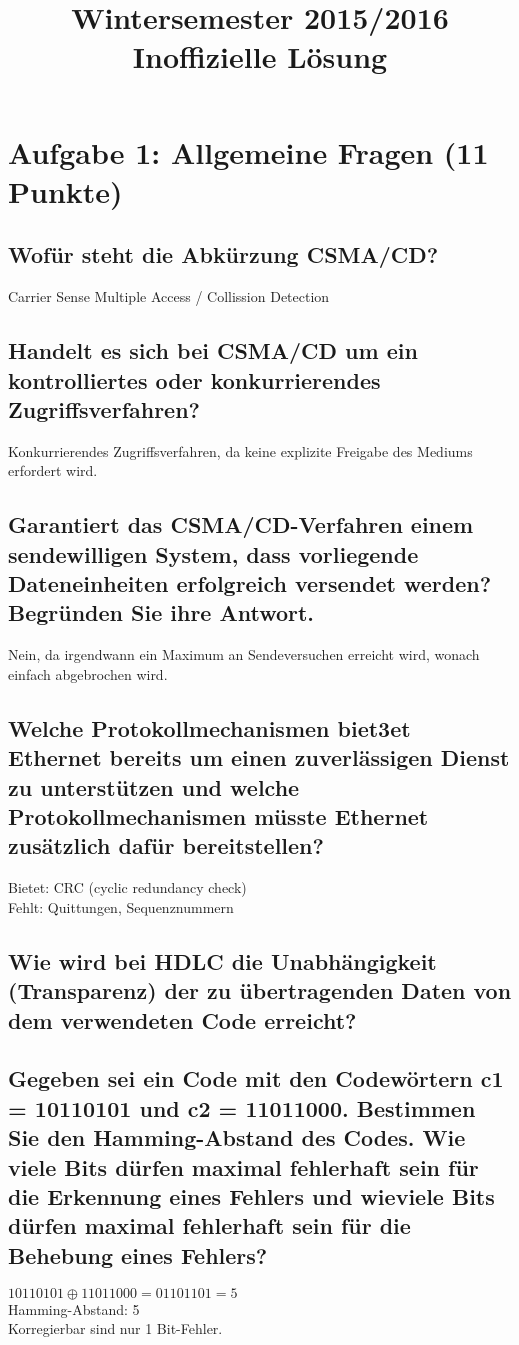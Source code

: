 \documentclass[a4paper]{article}
\title{Wintersemester 2015/2016 Inoffizielle Lösung}
\begin{document}
\section{Aufgabe 1: Allgemeine Fragen (11 Punkte)}
\subsection{Wofür steht die Abkürzung CSMA/CD?}
Carrier Sense Multiple Access / Collission Detection
\subsection{Handelt es sich bei CSMA/CD um ein kontrolliertes oder konkurrierendes Zugriffsverfahren?}
Konkurrierendes Zugriffsverfahren, da keine explizite Freigabe des Mediums erfordert wird.
\subsection{Garantiert das CSMA/CD-Verfahren einem sendewilligen System, dass vorliegende Dateneinheiten erfolgreich versendet werden? Begründen Sie ihre Antwort.}
Nein, da irgendwann ein Maximum an Sendeversuchen erreicht wird, wonach einfach abgebrochen wird.
\subsection{Welche Protokollmechanismen biet3et Ethernet bereits um einen zuverlässigen Dienst zu unterstützen und welche Protokollmechanismen müsste Ethernet zusätzlich dafür bereitstellen?}
Bietet: CRC (cyclic redundancy check)\\
Fehlt: Quittungen, Sequenznummern
\subsection{Wie wird bei HDLC die Unabhängigkeit (Transparenz) der zu übertragenden Daten von dem verwendeten Code erreicht?}
\subsection{Gegeben sei ein Code mit den Codewörtern c1 = 10110101 und c2 = 11011000. Bestimmen Sie den Hamming-Abstand des Codes. Wie viele Bits dürfen maximal fehlerhaft sein für die Erkennung eines Fehlers und wieviele Bits dürfen maximal fehlerhaft sein für die Behebung eines Fehlers?}
$10110101 \oplus 11011000 = 01101101 = 5$\\
Hamming-Abstand: 5\\
Korregierbar sind nur 1 Bit-Fehler.
\end{document}
